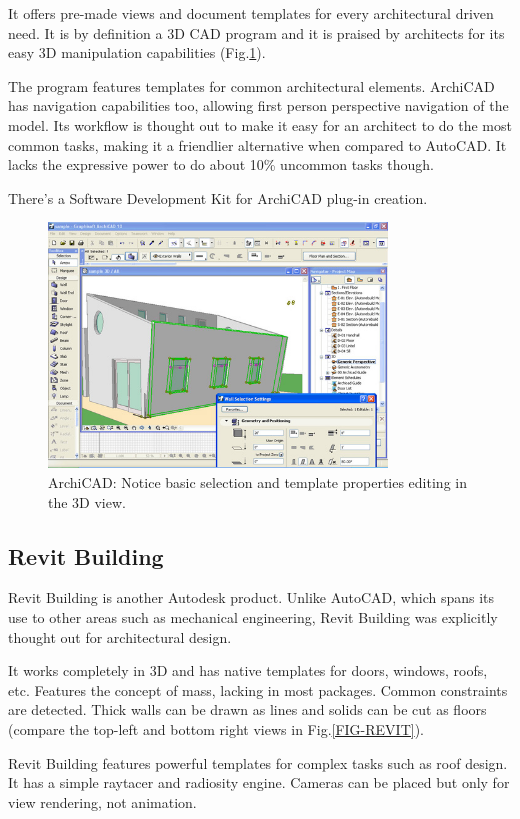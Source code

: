 It offers pre-made views and document templates for every architectural driven need.
It is by definition a 3D CAD program and it is praised by architects for its easy 3D
manipulation capabilities (Fig.\ref{FIG-ARCHICAD}).

The program features templates for common architectural elements.
ArchiCAD has navigation capabilities too, allowing first person perspective navigation of the model.
Its workflow is thought out to make it easy for an architect to do the most common tasks,
making it a friendlier alternative when compared to AutoCAD.
It lacks the expressive power to do about 10\% uncommon tasks though.

There's a Software Development Kit for ArchiCAD plug-in creation.

\begin{figure}[!ht]
    \centering
    \includegraphics[width=9cm]{gfx/archicad-1.png}
    \caption{ArchiCAD: Notice basic selection and template properties editing in the 3D view.}
    \label{FIG-ARCHICAD}
\end{figure}

\subsection{Revit Building}
Revit Building\cite{SITE-REVIT} is another Autodesk product.
Unlike AutoCAD, which spans its use to other areas such as mechanical engineering,
Revit Building was explicitly thought out for architectural design.

It works completely in 3D and has native templates for doors, windows, roofs, etc.
Features the concept of mass, lacking in most packages.
Common constraints are detected. Thick walls can be drawn as lines and solids can
be cut as floors (compare the top-left and bottom right views in Fig.\ref{FIG-REVIT}).

Revit Building features powerful templates for complex tasks such as roof design.
It has a simple raytacer and radiosity engine. Cameras can be placed but only for view
rendering, not animation.

